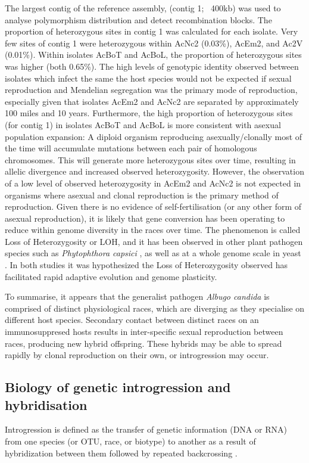The largest contig of the reference assembly, (contig 1; ~400kb) was used to analyse polymorphism distribution and detect recombination blocks.
The proportion of heterozygous sites in contig 1 was calculated for each isolate. 
Very few sites of contig 1 were heterozygous within AcNc2 (0.03\%), AcEm2, and Ac2V (0.01\%).
Within isolates AcBoT and AcBoL, the proportion of heterozygous sites was higher (both 0.65\%).
The high levels of genotypic identity observed between isolates which infect the same the host species would not be expected if sexual reproduction and Mendelian segregation was the primary mode of reproduction, especially given that isolates AcEm2 and AcNc2 are separated by approximately 100 miles and 10 years.
Furthermore, the high proportion of heterozygous sites (for contig 1) in isolates AcBoT and AcBoL is more consistent with asexual population expansion: A diploid organism reproducing asexually/clonally most of the time will accumulate mutations between each pair of homologous chromosomes.
This will generate more heterozygous sites over time, resulting in allelic divergence and increased observed heterozygosity.
However, the observation of a low level of observed heterozygosity in AcEm2 and AcNc2 is not expected in organisms where asexual and clonal reproduction is the primary method of reproduction.
Given there is no evidence of self-fertilisation (or any other form of asexual reproduction), it is likely that gene conversion has been operating to reduce within genome diversity in the races over time.
The phenomenon is called Loss of Heterozygosity or LOH, and it has been observed in other plant pathogen species such as \textit{Phytophthora capsici} \parencite{Lamour2012PathogenCapsici}⁠, as well as at a whole genome scale in yeast \parencite{Diogo2009}.
In both studies it was hypothesized the Loss of Heterozygosity observed has facilitated rapid adaptive evolution and genome plasticity.

To summarise, it appears that the generalist pathogen \textit{Albugo candida} is comprised of distinct physiological races, which are diverging as they specialise on different host species.
Secondary contact between distinct races on an immunosuppresed hosts results in inter-specific sexual reproduction between races, producing new hybrid offspring. 
These hybrids may be able to spread rapidly by clonal reproduction on their own, or introgression may occur.

\subsection{Biology of genetic introgression and hybridisation}
Introgression is defined as the transfer of genetic information (DNA or RNA) from one species (or OTU, race, or biotype) to another as a result of hybridization between them followed by repeated backcrossing \parencite{Ridley2004,Abbott2013}.

